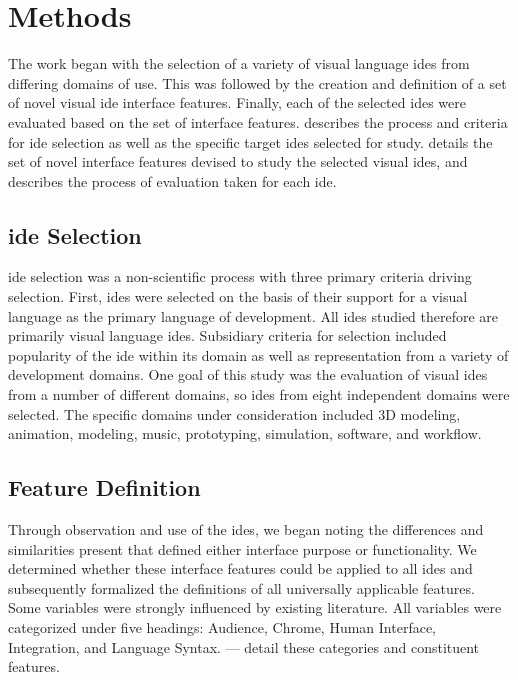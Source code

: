 \section{Methods} \label{sec:methods}

The work began with the selection of a variety of visual language \acp{ide} from
differing domains of use. This was followed by the creation and definition
of a set of novel visual \ac{ide} interface features. Finally, each of the
selected \acp{ide} were evaluated based on the set of interface features.
 describes the process and criteria for \ac{ide}
selection as well as the specific target \acp{ide} selected for study.
 details the set of novel interface features
devised to study the selected visual \acp{ide}, and 
describes the process of evaluation taken for each \ac{ide}.


\subsection{\acs{ide} Selection} \label{subsec:ideselection}

\ac{ide} selection was a non-scientific process with three primary criteria
driving selection. First, \acp{ide} were selected on the basis of their support
for a visual language as the primary language of development. All \acp{ide}
studied therefore are primarily visual language \acp{ide}. Subsidiary criteria
for selection included popularity of the \ac{ide} within its domain as well as
representation from a variety of development domains. One goal of this
study was the evaluation of visual \acp{ide} from a number of different domains,
so \acp{ide} from eight independent domains were selected. The specific domains
under consideration included 3D modeling, animation, modeling, music,
prototyping, simulation, software, and workflow.


\subsection{Feature Definition} \label{subsec:featuredefinition}

Through observation and use of the \acp{ide}, we began noting the differences
and similarities present that defined either interface purpose or
functionality. We determined whether these interface features could be
applied to all \acp{ide} and subsequently formalized the definitions of all
universally applicable features. Some variables were strongly influenced by
existing literature. All variables were categorized under five headings:
Audience, Chrome, Human Interface, Integration, and Language Syntax.
 ---  detail these
categories and constituent features.


